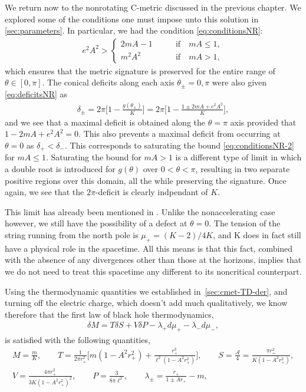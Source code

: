 \documentclass[
twoside,
openright,
frontopenright,
]{dmathesis}
\newcommand{\nn}{\nonumber}
\begin{document}
We return now to the nonrotating C-metric discussed in the previous chapter. We
explored some of the conditions one must impose unto this solution in
\cref{sec:parameters}. In particular, we had the condition
\eqref{eq:conditionsNR}:
\begin{align}
  \label{eq:conditionsNR-2}
  e^2A^2 >
  \begin{cases}
    2mA - 1 \qquad &\mbox{if} \quad mA \leqslant 1,\\
    m^2A^2 \qquad &\mbox{if} \quad mA > 1,
  \end{cases}
\end{align}
which ensures that the metric signature is preserved for the entire range of
$\theta\in [0,\pi]$. The conical deficits along each axis $\theta_\pm = 0,\pi$
were also given \eqref{eq:deficitsNR} as
\begin{align}
  \label{eq:deficitsNR-2}
  \delta_\pm=2\pi\bigg[1-\frac{g(\theta_\pm)}{K}\bigg] = 2\pi\bigg[1-\frac{1\pm
  2mA + e^2A^2}{K}\bigg],
\end{align}
and we see that a maximal deficit is obtained along the $\theta = \pi$ axis
provided that $1-2mA + e^2 A^2 = 0$. This also prevents a maximal deficit from
occurring at $\theta = 0$ as $\delta_+<\delta_-$. This corresponds to saturating
the bound \eqref{eq:conditionsNR-2} for $mA \leqslant 1$. Saturating the bound
for $mA > 1$ is a different type of limit in which a double root is introduced
for $g(\theta)$ over $0<\theta<\pi$, resulting in two separate positive regions
over this domain, all the while preserving the signature. Once again, we see
that the $2\pi$-deficit is clearly indpendant of $K$.

This limit has already been mentioned in
\cite{Chen:2015vma,Hubeny:2009ru}. Unlike the nonaccelerating case however, we
still have the possibility of a defect at $\theta = 0$. The tension of the
string running from the north pole is $\mu_+ = (K-2)/4K$, and K does in fact
still have a physical role in the spacetime. All this means is that this fact,
combined with the absence of any divergences other than those at the horizons,
implies that we do not need to treat this spacetime any different to its
noncritical counterpart.

Using the thermodynamic quantities we established in~\cref{sec:cmet-TD-der}, and
turning off the electric charge, which doesn't add much qualitatively, we know
therefore that the first law of black hole thermodynamics,
\begin{align}\label{eq:firstlawnr}
  \delta M = T\delta S + V\delta P - \lambda_+ d\mu_+ - \lambda_- d\mu_-,
\end{align}
is satisfied with the following quantities,
\begin{gather}
  M=\frac{m}{K},\qquad T=\frac{1}{2\pi
    r_+^2}\bigg[m(1-A^2 r_+^2) + \frac{r_+^3}{\ell^2(1-A^2 r_+^2)}\bigg], \qquad
  S=\frac{\mathcal{A}}{4} = \frac{\pi r_+^2}{K(1- A^2 r_+^2)},\nn\\ 
  V=\frac{4 \pi  r_+^3}{3 K (1- A^2 r_+^2)^2}, \qquad P=\frac{3}{8\pi \ell^2},
  \qquad \lambda_\pm = \frac{r_+}{1\pm A r_+} - m,
\end{gather}
\end{document}
